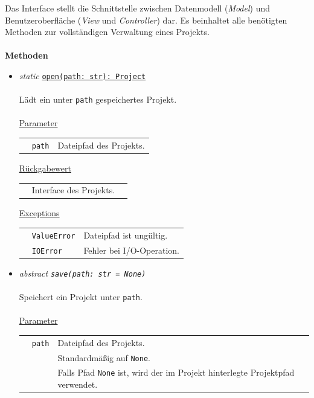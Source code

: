\documentclass{article}
\begin{document}
\begin{itemize}
Das Interface stellt die Schnittstelle zwischen Datenmodell (\emph{Model}) und Benutzeroberfläche (\emph{View} und \emph{Controller}) dar. Es beinhaltet alle benötigten Methoden zur vollständigen Verwaltung eines Projekts.
\\\\

\textbf{Methoden}
\begin{itemize}\setlength\itemsep{3em}
\item \textit{\flqq{}static\frqq} \texttt{\underline{open(path: str): Project}}\\\\
Lädt ein unter \texttt{path} gespeichertes Projekt.
\\\\
\underline{Parameter}\\
\begin{tabular}{lll}
 & \texttt{path} & Dateipfad des Projekts.\\
\end{tabular}

\underline{Rückgabewert}\\
\begin{tabular}{lll}
 & Interface des Projekts.\\
\end{tabular}

\underline{Exceptions}\\
\begin{tabular}{lll}
 & \texttt{ValueError} & Dateipfad ist ungültig.\\
 & \texttt{IOError} & Fehler bei I/O-Operation.\\
\end{tabular}


\item \textit{\flqq{}abstract\frqq} \texttt{\textit{save(path: str = None)}}\\\\
Speichert ein Projekt unter \texttt{path}.
\\\\
\underline{Parameter}\\
\begin{tabular}{lll}
 & \texttt{path} & Dateipfad des Projekts.\\
 && Standardmäßig auf \texttt{None}.\\
 && Falls Pfad \texttt{None} ist, wird der im Projekt hinterlegte Projektpfad verwendet.\\
\end{tabular}


\end{itemize}
\end{itemize}
\end{document}
